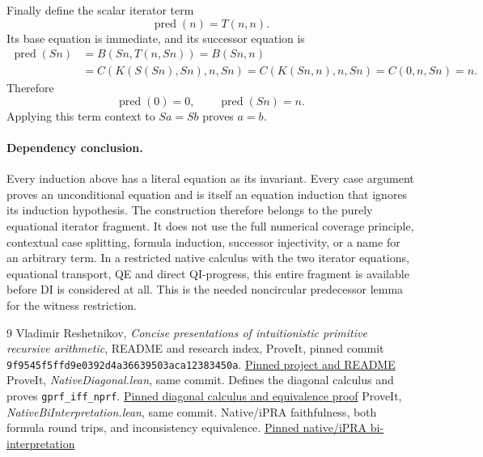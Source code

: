 \documentclass[11pt]{article}
\begin{document}
Finally define the scalar iterator term
\[
 \operatorname{pred}(n)=T(n,n).
\]
Its base equation is immediate, and its successor equation is
\begin{align*}
 \operatorname{pred}(Sn)
 &=B(Sn,T(n,Sn))=B(Sn,n)\\
 &=C(K(S(Sn),Sn),n,Sn)
  =C(K(Sn,n),n,Sn)=C(0,n,Sn)=n.
\end{align*}
Therefore
\[
 \boxed{\operatorname{pred}(0)=0,\qquad
        \operatorname{pred}(Sn)=n.}
\]
Applying this term context to $Sa=Sb$ proves $a=b$.

\paragraph{Dependency conclusion.}
Every induction above has a literal equation as its invariant. Every case
argument proves an unconditional equation and is itself an equation induction
that ignores its induction hypothesis. The construction therefore belongs to
the purely equational iterator fragment. It does not use the full numerical
coverage principle, contextual case splitting, formula induction, successor
injectivity, or a name for an arbitrary term. In a restricted native calculus
with the two iterator equations, equational transport, QE and direct
QI-progress, this entire fragment is available before DI is considered at all.
This is the needed noncircular predecessor lemma for the witness restriction.

\begin{thebibliography}{9}
 Vladimir Reshetnikov, \emph{Concise presentations of intuitionistic primitive recursive arithmetic}, README and research index, ProveIt, pinned commit \texttt{9f9545f5ffd9e0392d4a36639503aca12383450a}.\newline
\href{https://github.com/VladimirReshetnikov/ProveIt/tree/9f9545f5ffd9e0392d4a36639503aca12383450a/Logic/PrimitiveRecursiveArithmetic/ConciseIPRA}{Pinned project and README}
 ProveIt, \emph{NativeDiagonal.lean}, same commit. Defines the diagonal calculus and proves \texttt{gprf\_iff\_nprf}.\newline
\href{https://github.com/VladimirReshetnikov/ProveIt/blob/9f9545f5ffd9e0392d4a36639503aca12383450a/Logic/PrimitiveRecursiveArithmetic/ConciseIPRA/Lean/ConciseIPRA/NativeDiagonal.lean}{Pinned diagonal calculus and equivalence proof}
 ProveIt, \emph{NativeBiInterpretation.lean}, same commit. Native/iPRA faithfulness, both formula round trips, and inconsistency equivalence.\newline
\href{https://github.com/VladimirReshetnikov/ProveIt/blob/9f9545f5ffd9e0392d4a36639503aca12383450a/Logic/PrimitiveRecursiveArithmetic/ConciseIPRA/Lean/ConciseIPRA/NativeBiInterpretation.lean}{Pinned native/iPRA bi-interpretation}
\end{thebibliography}
\end{document}
